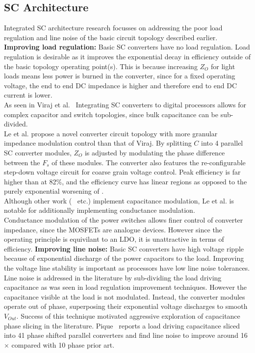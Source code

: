\documentclass[letterpaper,twocolumn,10pt]{article}
\begin{document}
\subsection{SC Architecture}
Integrated SC architecture research focusses on addressing the poor load regulation and line noise of the basic circuit topology described earlier.\\
\textbf{Improving load regulation: }Basic SC converters have no load regulation. Load regulation is desirable as it improves the exponential decay in efficiency outside of the basic topology operating point(s). This is because increasing $Z_O$ for light loads means less power is burned in the converter, since for a fixed operating voltage, the end to end DC impedance is higher and therefore end to end DC current is lower.\\
\indent As seen in  Viraj et al.~\cite{Viraj2007} Integrating SC converters to digital processors allows for complex capacitor and switch topologies, since bulk capacitance can be sub-divided.\\
Le et al. \cite{Phuck2010} propose a novel converter circuit topology with more granular impedance modulation control than that of Viraj. By splitting $C$ into 4 parallel SC converter modules, $Z_O$ is adjusted by modulating the phase difference between the $F_s$ of these modules. The converter also features the re-configurable step-down voltage circuit for coarse grain voltage control. Peak efficiency is far higher than \cite{Viraj2007} at 82\%, and the efficiency curve has linear regions as opposed to the purely exponential worsening of \cite{Viraj2007}.\\
Although other work (~\cite{Ramadass2010} etc.) implement capacitance modulation, Le et al. is notable for additionally implementing conductance modulation.\\
Conductance modulation of the power switches allows finer control of converter impedance, since the MOSFETs are analogue devices. However since the operating principle is equivilant to an LDO, it is unattractive in terms of efficiency. 
\textbf{Improving line noise: }Basic SC converters have high voltage ripple because of exponential discharge of the power capacitors to the load. Improving the voltage line stability is important as processors have low line noise tolerances.\\ 
Line noise is addressed in the literature by sub-dividing the load driving capacitance as was seen in load regulation improvement techniques. However the capacitance visible at the load is not modulated. Instead, the converter modules operate out of phase, superposing their exponential voltage discharges to smooth $V_{Out}$. Success of this technique motivated aggressive exploration of capacitance phase slicing in the literature. Pique~\cite{Pique2012} reports a load driving capacitance sliced into 41 phase shifted parallel converters and find line noise to improve around 16$\times$ compared with 10 phase prior art.\\ 
\end{document}
